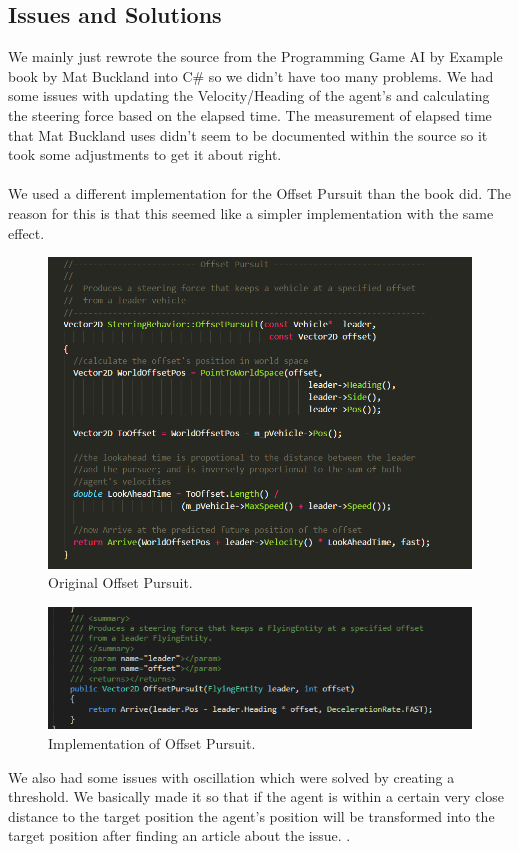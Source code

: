 \subsection{Issues and Solutions}
We mainly just rewrote the source from the Programming Game AI by Example book by Mat Buckland into C\# so we didn't have too many problems. We had some issues with updating the Velocity/Heading of the agent's and calculating the steering force based on the elapsed time. The measurement of elapsed time that Mat Buckland uses didn't seem to be documented within the source so it took some adjustments to get it about right. \\\\ We used a different implementation for the Offset Pursuit than the book did. The reason for this is that this seemed like a simpler implementation with the same effect.

\begin{figure}[H]
	\centering
	\includegraphics[width=0.7\linewidth]{Images/offsetsource}
	\caption{Original Offset Pursuit.}
	\label{fig:offsetimplementation}
\end{figure} 
\begin{figure}[H]
	\centering
	\includegraphics[width=0.7\linewidth]{Images/offsetimplementation}
	\caption{Implementation of Offset Pursuit.}
	\label{fig:offsetsource}
\end{figure} 
We also had some issues with oscillation which were solved by creating a threshold.
We basically made it so that if the agent is within a certain very close distance to the target position the agent's position will be transformed into the target position after finding an article about the issue. \cite{steeringissue}. 
